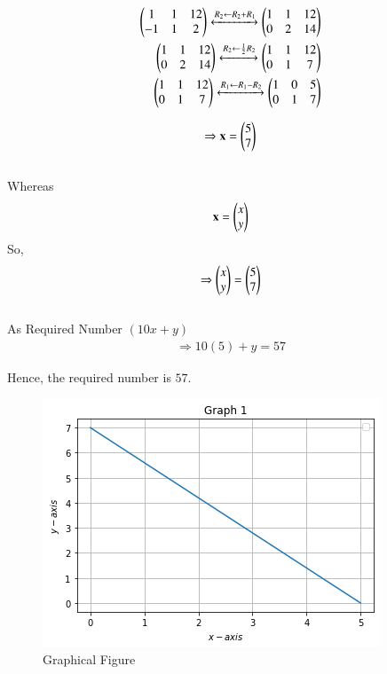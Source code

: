 \documentclass[journal,12pt,twocolumn]{IEEEtran}
\begin{document}
\begin{align}
\begin{pmatrix}1&1&12\\-1&1&2\end{pmatrix}\xleftrightarrow{R_2\leftarrow R_2+ R_1} \begin{pmatrix}1&1&12\\0&2&14\end{pmatrix}
\\
\begin{pmatrix}1&1&12\\0&2&14\end{pmatrix}\xleftrightarrow{R_2\leftarrow \frac{1}{2}R_2} \begin{pmatrix}1&1&12 \\ 0&1&7\end{pmatrix}
\\
\begin{pmatrix}1&1&12\\0&1&7\end{pmatrix}\xleftrightarrow{R_1 \leftarrow R_1-R_2}
\begin{pmatrix}1&0&5\\0&1&7\end{pmatrix}
\end{align}

\begin{align}
    \Rightarrow \mathbf{x}=\begin{pmatrix}5\\7\end{pmatrix}
\end{align}
    \\
              Whereas  \begin{align}
                  \mathbf{x}=\begin{pmatrix}x \\ y\end{pmatrix}
              \end{align}
  So,   \begin{align}
    \Rightarrow \begin{pmatrix}x\\y\end{pmatrix}=\begin{pmatrix}5\\7\end{pmatrix}
    \end{align} \\
    
    As Required Number $(10x+y)$
\begin{align}
    \Rightarrow 10(5)+y=57
\end{align}

  Hence, the required number is $57$.
\begin{figure}[!ht]
    \centering
    \includegraphics [width=\columnwidth]{image1.png}
    \caption{Graphical Figure}
\end{figure}
\end{document}
